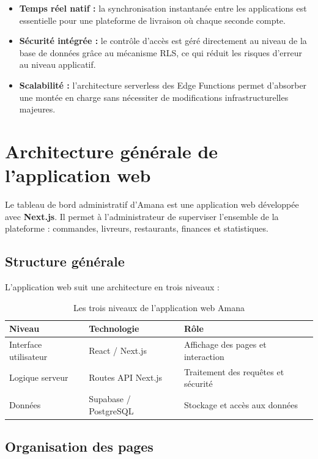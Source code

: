 \documentclass[12pt,fleqn,a4paper]{report}
\begin{document}
\begin{justify}
\begin{itemize}
    \item \textbf{Temps réel natif :} la synchronisation instantanée
    entre les applications est essentielle pour une plateforme de
    livraison où chaque seconde compte.

    \item \textbf{Sécurité intégrée :} le contrôle d'accès est
    géré directement au niveau de la base de données grâce au
    mécanisme RLS, ce qui réduit les risques d'erreur au niveau
    applicatif.

    \item \textbf{Scalabilité :} l'architecture serverless des
    Edge Functions permet d'absorber une montée en charge sans
    nécessiter de modifications infrastructurelles majeures.
\end{itemize}

\section{Architecture générale de l'application web}

Le tableau de bord administratif d'Amana est une application web
développée avec \textbf{Next.js}. Il permet à l'administrateur
de superviser l'ensemble de la plateforme : commandes, livreurs,
restaurants, finances et statistiques.

\subsection{Structure générale}

L'application web suit une architecture en trois niveaux :

\begin{table}[H]
\centering
\renewcommand{\arraystretch}{1.4}
\begin{tabular}{|l|l|l|}
\hline
\textbf{Niveau} & \textbf{Technologie} & \textbf{Rôle} \\
\hline
Interface utilisateur & React / Next.js &
Affichage des pages et interaction \\
\hline
Logique serveur & Routes API Next.js &
Traitement des requêtes et sécurité \\
\hline
Données & Supabase / PostgreSQL &
Stockage et accès aux données \\
\hline
\end{tabular}
\caption{Les trois niveaux de l'application web Amana}
\end{table}

\subsection{Organisation des pages}


\end{justify}
\end{document}
